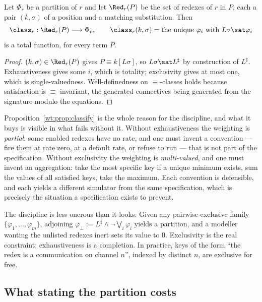 \begin{proposition}[Classification]
\label{wt:prop:classify}
Let $\Phi_r$ be a partition of $r$ and let $\Red_r(P)$ be the set of redexes of $r$ in
$P$, each a pair $(k,\sigma)$ of a position and a matching substitution. Then
\[
  \class_r : \Red_r(P) \longrightarrow \Phi_r,
  \qquad
  \class_r(k,\sigma) = \text{the unique } \varphi_i \text{ with } L\sigma \sat \varphi_i
\]
is a total function, for every term $P$.
\end{proposition}

\begin{proof}
$(k,\sigma) \in \Red_r(P)$ gives $P \equiv k[L\sigma]$, so $L\sigma \sat L^{\sharp}$ by
construction of $L^{\sharp}$. Exhaustiveness gives some $i$, which is totality;
exclusivity gives at most one, which is single-valuedness. Well-definedness on
$\equiv$-classes holds because satisfaction is $\equiv$-invariant, the generated
connectives being generated from the signature modulo the equations.
\end{proof}

Proposition~\ref{wt:prop:classify} is the whole reason for the discipline, and what it
buys is visible in what fails without it. Without exhaustiveness the weighting is
\emph{partial}: some enabled redexes have no rate, and one must invent a convention ---
fire them at rate zero, at a default rate, or refuse to run --- that is not part of the
specification. Without exclusivity the weighting is \emph{multi-valued}, and one must
invent an aggregation: take the most specific key if a unique minimum exists, sum the
values of all satisfied keys, take the maximum. Each convention is defensible, and each
yields a different simulator from the same specification, which is precisely the situation
a specification exists to prevent.

\begin{remark}
\label{wt:rmk:default}
The discipline is less onerous than it looks. Given any pairwise-exclusive family
$\{\varphi_1,\ldots,\varphi_m\}$, adjoining
$\varphi_{\bot} := L^{\sharp} \wedge \neg\bigvee_i \varphi_i$ yields a partition, and a
modeller wanting the unlisted redexes inert sets its value to $0$. Exclusivity is the
real constraint; exhaustiveness is a completion. In practice, keys of the form ``the
redex is a communication on channel $n$'', indexed by distinct $n$, are exclusive for
free.
\end{remark}

\subsection{What stating the partition costs}
\label{wt:sec:closure}


